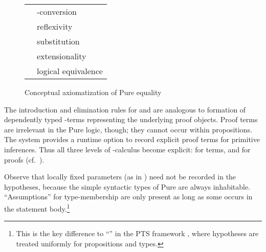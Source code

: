 \begin{isabellebody}
\begin{isamarkuptext}
  \begin{figure}[htb]
  \begin{center}
  \begin{tabular}{ll}
  \isa{{\isasymturnstile}\ {\isacharparenleft}{\isasymlambda}x{\isachardot}\ b{\isacharbrackleft}x{\isacharbrackright}{\isacharparenright}\ a\ {\isasymequiv}\ b{\isacharbrackleft}a{\isacharbrackright}} & \isa{{\isasymbeta}}-conversion \\
  \isa{{\isasymturnstile}\ x\ {\isasymequiv}\ x} & reflexivity \\
  \isa{{\isasymturnstile}\ x\ {\isasymequiv}\ y\ {\isasymLongrightarrow}\ P\ x\ {\isasymLongrightarrow}\ P\ y} & substitution \\
  \isa{{\isasymturnstile}\ {\isacharparenleft}{\isasymAnd}x{\isachardot}\ f\ x\ {\isasymequiv}\ g\ x{\isacharparenright}\ {\isasymLongrightarrow}\ f\ {\isasymequiv}\ g} & extensionality \\
  \isa{{\isasymturnstile}\ {\isacharparenleft}A\ {\isasymLongrightarrow}\ B{\isacharparenright}\ {\isasymLongrightarrow}\ {\isacharparenleft}B\ {\isasymLongrightarrow}\ A{\isacharparenright}\ {\isasymLongrightarrow}\ A\ {\isasymequiv}\ B} & logical equivalence \\
  \end{tabular}
  \caption{Conceptual axiomatization of Pure equality}\label{fig:pure-equality}
  \end{center}
  \end{figure}

  The introduction and elimination rules for \isa{{\isasymAnd}} and \isa{{\isasymLongrightarrow}} are analogous to formation of dependently typed \isa{{\isasymlambda}}-terms representing the underlying proof objects.  Proof terms
  are irrelevant in the Pure logic, though; they cannot occur within
  propositions.  The system provides a runtime option to record
  explicit proof terms for primitive inferences.  Thus all three
  levels of \isa{{\isasymlambda}}-calculus become explicit: \isa{{\isasymRightarrow}} for
  terms, and \isa{{\isasymAnd}{\isacharslash}{\isasymLongrightarrow}} for proofs (cf.\
  \cite{Berghofer-Nipkow:2000:TPHOL}).

  Observe that locally fixed parameters (as in ) need not be recorded in the hypotheses, because
  the simple syntactic types of Pure are always inhabitable.
  ``Assumptions''  for type-membership are only
  present as long as some \isa{x\isactrlisub {\isasymtau}} occurs in the statement
  body.\footnote{This is the key difference to ``\isa{{\isasymlambda}HOL}'' in
  the PTS framework \cite{Barendregt-Geuvers:2001}, where hypotheses
  \isa{x\ {\isacharcolon}\ A} are treated uniformly for propositions and types.}


\end{isamarkuptext}
\end{isabellebody}
